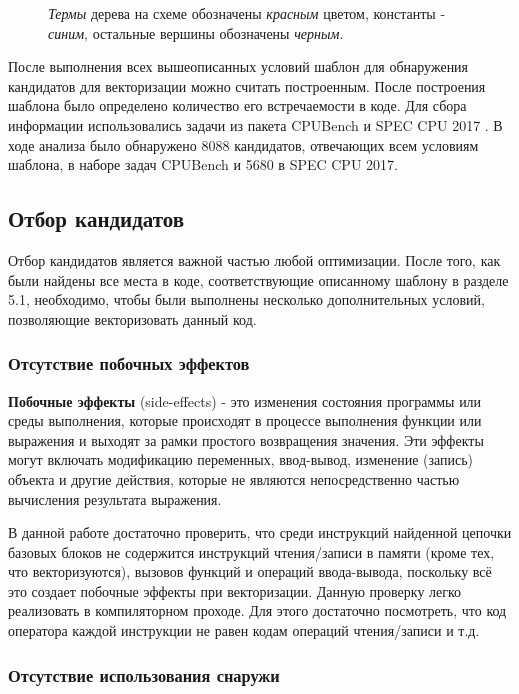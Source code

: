 \begin{figure}[!htb]
    \centering
    
    \caption{\textit{Термы} дерева на схеме обозначены \textit{красным} цветом, константы - \textit{синим}, остальные вершины обозначены \textit{черным}.}
    \label{termtree}
\end{figure}

После выполнения всех вышеописанных условий шаблон для обнаружения кандидатов для векторизации можно считать построенным. После построения шаблона было определено количество его встречаемости в коде. Для сбора информации использовались задачи из пакета CPUBench \cite{lu2023cpubench} и SPEC CPU 2017 \cite{bucek2018spec}. В ходе анализа было обнаружено 8088 кандидатов, отвечающих всем условиям шаблона, в наборе задач CPUBench и 5680 в SPEC CPU 2017.

\subsection{Отбор кандидатов}

Отбор кандидатов является важной частью любой оптимизации. После того, как были найдены все места в коде, соответствующие описанному шаблону в разделе 5.1, необходимо, чтобы были выполнены несколько дополнительных условий, позволяющие векторизовать данный код.

\subsubsection{Отсутствие побочных эффектов}

\textbf{Побочные эффекты} (side-effects) - это изменения состояния программы или среды выполнения, которые происходят в процессе выполнения функции или выражения и выходят за рамки простого возвращения значения. Эти эффекты могут включать модификацию переменных, ввод-вывод, изменение (запись) объекта и другие действия, которые не являются непосредственно частью вычисления результата выражения.

В данной работе достаточно проверить, что среди инструкций найденной цепочки базовых блоков не содержится инструкций чтения/записи в памяти (кроме тех, что векторизуются), вызовов функций и операций ввода-вывода, поскольку всё это создает побочные эффекты при векторизации. Данную проверку легко реализовать в компиляторном проходе. Для этого достаточно посмотреть, что код оператора каждой инструкции не равен кодам операций чтения/записи и т.д. 

\subsubsection{Отсутствие использования снаружи}

